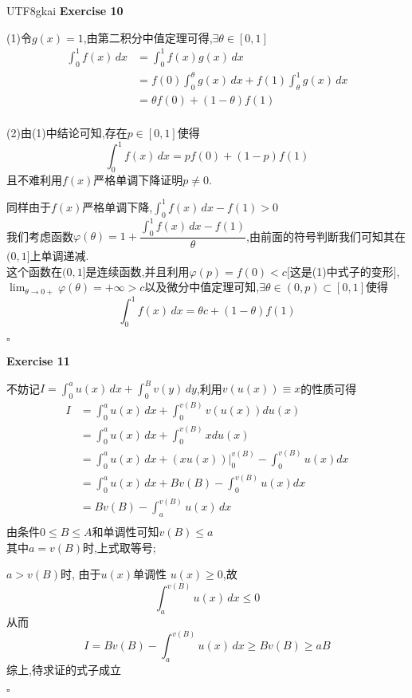 \documentclass{article}
\newenvironment{exercise}[1]{%
{\textbf{Exercise #1} \\ 
    }
}{
  \hfill $\square$ 
  \par\bigskip 
}
\begin{document}
\begin{CJK}{UTF8}{gkai}
\begin{exercise}{10}

    (1)令$g(x) = 1$,由第二积分中值定理可得,$\exists \theta \in [0,1]$
    \[
    \begin{aligned}
        \int_{0}^{1}f(x)\, dx &= \int_{0}^{1}f(x) g(x)\, dx \\
        &= f(0) \int_{0}^{\theta}g(x)\, dx + f(1) \int_{\theta}^{1} g(x)\, dx\\
        &= \theta f(0) + (1 - \theta)f(1)\\
    \end{aligned}   
    \]

    (2)由(1)中结论可知,存在$p \in [0,1]$使得
    \[\int_{0}^{1}f(x)\, dx = p f(0) + (1 - p)f(1)\]
    且不难利用$f(x)$严格单调下降证明$p \neq 0$.

    同样由于$f(x)$严格单调下降,$\int_{0}^{1}f(x)\, dx - f(1) > 0$\\

    我们考虑函数$\varphi(\theta) = 1 + \dfrac{\int_{0}^{1}f(x)\, dx - f(1)}{\theta}$,由前面的符号判断我们可知其在$(0,1]$上单调递减.\\

    这个函数在$(0,1]$是连续函数,并且利用$\varphi(p) = f(0) < c$[这是(1)中式子的变形],$\lim_{\theta\to 0+}\varphi(\theta) = +\infty > c$以及微分中值定理可知,$\exists \theta \in (0,p) \subset [0,1]$使得
    \[\int_{0}^{1}f(x)\, dx = \theta c + (1 - \theta)f(1)\]
\end{exercise}

\begin{exercise}{11}
    不妨记$I = \int_{0}^{a}u(x)\, dx + \int_{0}^{B}v(y)\, dy$,利用$v(u(x)) \equiv x$的性质可得
    \[\begin{aligned}
        I &= \int_{0}^{a}u(x)\, dx + \int_{0}^{v(B)} v(u(x)) d u(x)\\
        &= \int_{0}^{a}u(x)\, dx + \int_{0}^{v(B)} x d u(x)\\
        &= \int_{0}^{a}u(x)\, dx + (x u(x))|_{0}^{v(B)} - \int_{0}^{v(B)} u(x) dx\\
        &= \int_{0}^{a}u(x)\, dx + B v(B) - \int_{0}^{v(B)} u(x) dx\\
        &= B v(B) - \int_{a}^{v(B)} u(x)\, dx\\
    \end{aligned}\]
    由条件$0 \leq B \leq A$和单调性可知$v(B) \leq a$\\

    其中$a = v(B)$时,上式取等号;

    $a > v(B)$时, 由于$u(x)$单调性 $u(x) \geq 0$,故
    \[\int_{a}^{v(B)} u(x)\, dx \leq 0\]
    从而
    \[I = B v(B) - \int_{a}^{v(B)} u(x)\, dx \geq B v(B) \geq a B\]
    综上,待求证的式子成立
\end{exercise}

\end{CJK}
\end{document}
